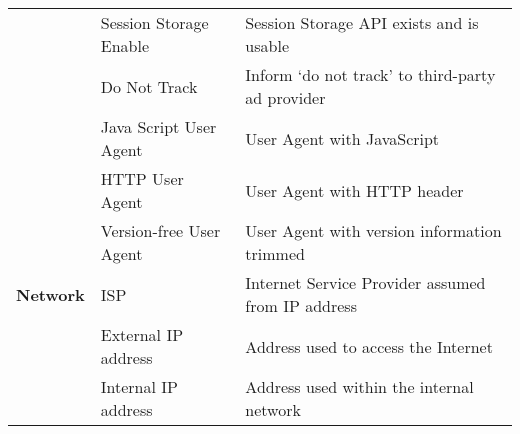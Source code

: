 \begin{table*}[!h]
{\begin{tabular}{|c||l|l|}
        & Session Storage Enable & Session Storage API exists and is usable\\
        & Do Not Track & Inform `do not track' to third-party ad provider\\
        & Java Script User Agent & User Agent with JavaScript\\
        & HTTP User Agent & User Agent with HTTP header\\
        & Version-free User Agent & User Agent with version information trimmed\\
        \textbf{Network} 
        & ISP & Internet Service Provider assumed from IP address\\
        & External IP address & Address used to access the Internet\\
        & Internal IP address & Address used within the internal network\\
		\hline
	\end{tabular}
    }
\end{table*}
